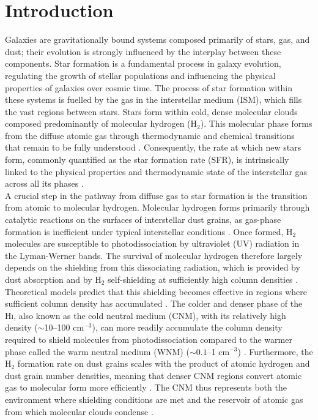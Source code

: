 \chapter[Introduction]{Introduction}
\label{Chap:Intro}

\makeatletter
\setlength{\@fptop}{0pt} 
\makeatother

Galaxies are gravitationally bound systems composed primarily of stars, gas, and dust; their evolution is strongly influenced by the interplay between these components. Star formation is a fundamental process in galaxy evolution, regulating the growth of stellar populations and influencing the physical properties of galaxies over cosmic time. The process of star formation within these systems is fuelled by the gas in the interstellar medium (ISM), which fills the vast regions between stars. Stars form within cold, dense molecular clouds composed predominantly of molecular hydrogen (H$_2$). This molecular phase forms from the diffuse atomic gas through thermodynamic and chemical transitions that remain to be fully understood \citep{Kennicutt1998, Klessen2016}. Consequently, the rate at which new stars form, commonly quantified as the star formation rate (SFR), is intrinsically linked to the physical properties and thermodynamic state of the interstellar gas across all its phases \citep{Fbigiel2008, Leroy2008}. \\\indent
A crucial step in the pathway from diffuse gas to star formation is the transition from atomic to molecular hydrogen. Molecular hydrogen forms primarily through catalytic reactions on the surfaces of interstellar dust grains, as gas-phase formation is inefficient under typical interstellar conditions \citep{Gould1963, Hollenbach1971}. Once formed, H$_2$ molecules are susceptible to photodissociation by ultraviolet (UV) radiation in the Lyman-Werner bands. The survival of molecular hydrogen therefore largely depends on the shielding from this dissociating radiation, which is provided by dust absorption and by H$_2$ self-shielding at sufficiently high column densities \citep{Draine1996, Krumholz2009, Sternberg2014}.\\\indent
Theoretical models predict that this shielding becomes effective in regions where sufficient column density has accumulated \citep{Krumholz2009, Sternberg2014}. The colder and denser phase of the \textrm{H\textsc{i}}, also known as the cold neutral medium (CNM), with its relatively high density ($\sim$10--100 cm$^{-3}$), can more readily accumulate the column density required to shield molecules from photodissociation compared to the warmer phase called the warm neutral medium (WNM) ($\sim 0.1$--1 cm$^{-3}$) \citep{Krumholz2009, Sternberg2014, Syed2020}. Furthermore, the H$_2$ formation rate on dust grains scales with the product of atomic hydrogen and dust grain number densities, meaning that denser CNM regions convert atomic gas to molecular form more efficiently \citep{Hollenbach1979, Wakelam2017}. The CNM thus represents both the environment where shielding conditions are met and the reservoir of atomic gas from which molecular clouds condense \citep{Wolfire2003, Klessen2016}.\\\indent

